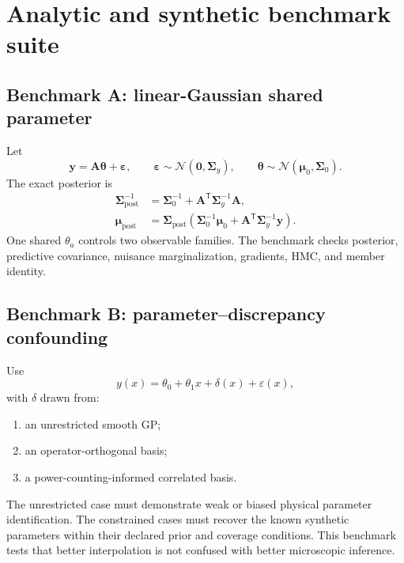 \documentclass[11pt]{article}
\newcommand{\cN}{\mathcal N}
\newcommand{\eps}{\varepsilon}
\newcommand{\post}{\mathrm{post}}
\newcommand{\GP}{\ensuremath{\mathrm{GP}}}
\newcommand{\HMC}{\ensuremath{\mathrm{HMC}}}
\begin{document}
\section{Analytic and synthetic benchmark suite}
\label{sec:benchmarks}

\subsection{Benchmark A: linear-Gaussian shared parameter}

Let
\begin{equation}
 \bm y
 =
 \bm A\bm\theta+\bm\eps,
 \qquad
 \bm\eps\sim\cN(\bm0,\bm\Sigma_y),
 \qquad
 \bm\theta\sim\cN(\bm\mu_0,\bm\Sigma_0).
 \label{eq:benchmark-a}
\end{equation}
The exact posterior is
\begin{align}
 \bm\Sigma_{\post}^{-1}
 &=
 \bm\Sigma_0^{-1}
 +
 \bm A^{\mathsf T}
 \bm\Sigma_y^{-1}
 \bm A,
 \label{eq:benchmark-a-cov}\\
 \bm\mu_{\post}
 &=
 \bm\Sigma_{\post}
 \left(
 \bm\Sigma_0^{-1}\bm\mu_0
 +
 \bm A^{\mathsf T}\bm\Sigma_y^{-1}\bm y
 \right).
 \label{eq:benchmark-a-mean}
\end{align}
One shared \(\theta_a\) controls two observable families.  The benchmark checks
posterior, predictive covariance, nuisance marginalization, gradients,
\(\HMC\), and member identity.

\subsection{Benchmark B: parameter--discrepancy confounding}

Use
\begin{equation}
 y(x)
 =
 \theta_0+\theta_1x+\delta(x)+\eps(x),
 \label{eq:benchmark-b}
\end{equation}
with \(\delta\) drawn from:
\begin{enumerate}
\item an unrestricted smooth \(\GP\);
\item an operator-orthogonal basis;
\item a power-counting-informed correlated basis.
\end{enumerate}
The unrestricted case must demonstrate weak or biased physical parameter
identification.  The constrained cases must recover the known synthetic
parameters within their declared prior and coverage conditions.  This
benchmark tests that better interpolation is not confused with better
microscopic inference.
\end{document}
